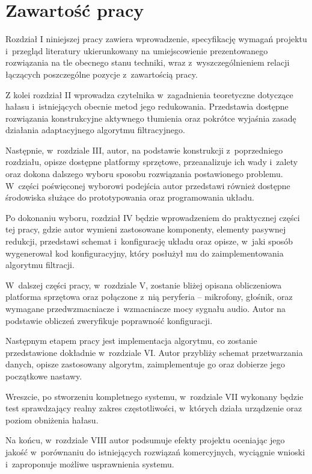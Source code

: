 \section{Zawartość pracy}
\label{sec:zawartoscPracy}
Rozdział I niniejszej pracy zawiera wprowadzenie, specyfikację wymagań projektu i~przegląd literatury ukierunkowany na umiejscowienie prezentowanego rozwiązania na tle obecnego stanu techniki, wraz z~wyszczególnieniem relacji łączących poszczególne pozycje z~zawartością pracy.

Z kolei rozdział II wprowadza czytelnika w~zagadnienia teoretyczne dotyczące hałasu i~istniejących obecnie metod jego redukowania. Przedstawia dostępne rozwiązania konstrukcyjne aktywnego tłumienia oraz pokrótce wyjaśnia zasadę działania adaptacyjnego algorytmu filtracyjnego.

Następnie, w~rozdziale III, autor, na podstawie konstrukcji z~poprzedniego rozdziału, opisze dostępne platformy sprzętowe, przeanalizuje ich wady i~zalety oraz dokona dalszego wyboru sposobu rozwiązania postawionego problemu. W~części poświęconej wyborowi podejścia autor przedstawi również dostępne środowiska służące do prototypowania oraz programowania układu.

Po dokonaniu wyboru, rozdział IV będzie wprowadzeniem do praktycznej części tej pracy, gdzie autor wymieni zastosowane komponenty, elementy pasywnej redukcji, przedstawi schemat i~konfigurację układu oraz opisze, w~jaki sposób wygenerował kod konfiguracyjny, który posłużył mu do zaimplementowania algorytmu filtracji.

W~dalszej części pracy, w~rozdziale V, zostanie bliżej opisana obliczeniowa platforma sprzętowa oraz połączone z~nią peryferia -- mikrofony, głośnik, oraz wymagane przedwzmacniacze i~wzmacniacze mocy sygnału audio. Autor na podstawie obliczeń zweryfikuje poprawność konfiguracji.

Następnym etapem pracy jest implementacja algorytmu, co zostanie przedstawione dokładnie w~rozdziale VI. Autor przybliży schemat przetwarzania danych, opisze zastosowany algorytm, zaimplementuje go oraz dobierze jego początkowe nastawy.

Wreszcie, po stworzeniu kompletnego systemu, w~rozdziale VII wykonany będzie test sprawdzający realny zakres częstotliwości, w~których działa urządzenie oraz poziom obniżenia hałasu.

Na końcu, w~rozdziale VIII autor podsumuje efekty projektu oceniając jego jakość w~porównaniu do istniejących rozwiązań komercyjnych, wyciągnie wnioski i~zaproponuje możliwe usprawnienia systemu.
